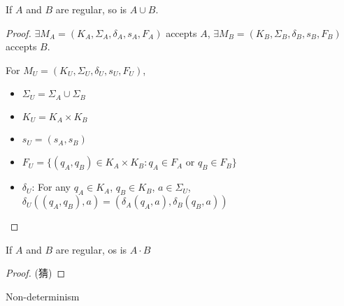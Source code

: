 \begin{theorem}
    If $A$ and $B$ are regular, so is $A\cup B$. 
\end{theorem}
\begin{proof}
    $\exists M_A=(K_A, \Sigma_A, \delta_A, s_A, F_A)$ accepts $A$, $\exists M_B=(K_B, \Sigma_B, \delta_B, s_B, F_B)$ accepts $B$.
    
    For $M_U=(K_U, \Sigma_U, \delta_U, s_U, F_U)$, 
    \begin{itemize}
        \item $\Sigma_U=\Sigma_A \cup \Sigma_B$
        \item $K_U=K_A\times K_B$
        \item $s_U=(s_A, s_B)$
        \item $F_U=\{ (q_A, q_B) \in K_A\times K_B:q_A\in F_A\text{ or }q_B\in F_B \}$
        \item $\delta_U$: For any $q_A\in K_A$, $q_B\in K_B$, $a\in \Sigma_U$, $\delta_U((q_A, q_B), a)=(\delta_A(q_A,a), \delta_B(q_B, a))$
    \end{itemize}
\end{proof}

\begin{theorem}
    If $A$ and $B$ are regular, os is $A\cdot B$
\end{theorem}
\begin{proof}
    (猜)
\end{proof}

Non-determinism
